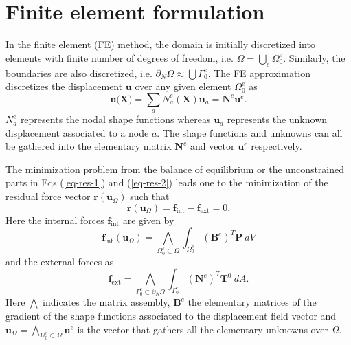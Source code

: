 \chapter{Finite element formulation}\label{app-fem}
In the finite element (FE) method, the domain is initially discretized into elements with finite number of degrees of freedom, i.e. $ \Omega=\bigcup_e\Omega_0^e $. Similarly, the boundaries are also discretized, i.e. $ \partial_N\Omega\approx\bigcup\Gamma_0^e $. The FE approximation discretizes the displacement $ \textbf{u} $ over any given element $ \Omega_0^e $ as
\begin{equation}\label{app-fem-1}
\textbf{u(X)}=\sum_aN_a^e(\textbf{X})\textbf{u}_a=\textbf{N}^e\textbf{u}^e.
\end{equation}
$ N^e_a $ represents the nodal shape functions whereas $ \textbf{u}_a $ represents the unknown displacement associated to a node $ a $. The shape functions and unknowns can all be gathered into the elementary matrix $ \textbf{N}^e $ and vector $ \textbf{u}^e $ respectively.

The minimization problem from the balance of equilibrium or the unconstrained parts in Eqs (\ref{eq-res-1}) and (\ref{eq-res-2}) leads one to the minimization of the residual force vector $ \textbf{r}(\textbf{u}_\Omega) $ such that
\begin{equation}\label{app-fem-2}
\textbf{r}(\textbf{u}_\Omega)=\textbf{f}_\text{int}-\textbf{f}_\text{ext}=0.
\end{equation}
Here the internal forces $ \textbf{f}_\text{int} $ are given by
\begin{equation}\label{app-fem-3}
\textbf{f}_\text{int}(\textbf{u}_\Omega)=\underset{\Omega_0^e\subset\Omega}{\bigwedge}\int_{\Omega_0^e}(\textbf{B}^e)^T\textbf{P}\ dV
\end{equation}
and the external forces as
\begin{equation}\label{app-fem-4}
\textbf{f}_\text{ext}=
\underset{\Gamma_0^e\subset\partial_N\Omega}{\bigwedge}\int_{\Gamma_0^e}(\textbf{N}^e)^T\textbf{T}^0\ dA.
\end{equation}
Here $ \bigwedge $ indicates the matrix assembly, $ \textbf{B}^e $ the elementary matrices of the gradient of the shape functions associated to the displacement field vector and $ \textbf{u}_\Omega=\bigwedge_{\Omega_0^e\subset\Omega}\textbf{u}^e $ is the vector that gathers all the elementary unknowns over $ \Omega $.

